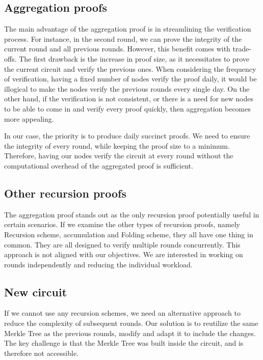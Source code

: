 \subsection{Aggregation proofs}
The main advantage of the aggregation proof is in streamlining the verification process. For instance, in the second round, we can prove the integrity of the current round and all previous rounds.
However, this benefit comes with trade-offs. The first drawback is the increase in proof size, as it necessitates to prove the current circuit and verify the previous ones.
When considering the frequency of verification, having a fixed number of nodes verify the proof daily, it would be illogical to make the nodes verify the previous rounds every single day.
On the other hand, if the verification is not consistent, or there is a need for new nodes to be able to come in and verify every proof quickly, then aggregation becomes more appealing.


In our case, the priority is to produce daily succinct proofs. We need to ensure the integrity of every round, while keeping the proof size to a minimum.
Therefore, having our nodes verify the circuit at every round without the computational overhead of the aggregated proof is sufficient.




\subsection{Other recursion proofs}
The aggregation proof stands out as the only recursion proof potentially useful in certain scenarios.
If we examine the other types of recursion proofs, namely Recursion scheme, accumulation and Folding scheme, they all have one thing in common.
They are all designed to verify multiple rounds concurrently.
This approach is not aligned with our objectives. We are interested in working on rounds independently and reducing the individual workload.




\subsection{New circuit}
If we cannot use any recursion schemes, we need an alternative approach to reduce the complexity of subsequent rounds.
Our solution is to reutilize the same Merkle Tree as the previous rounds, modify  and adapt it to include the changes.
The key challenge is that the Merkle Tree was built inside the circuit, and is therefore not accessible.


